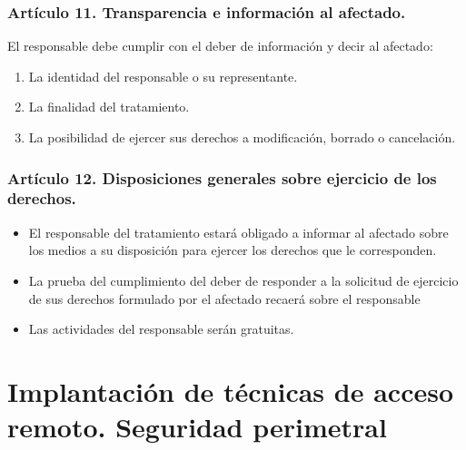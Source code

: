 \documentclass[letterpaper,10pt,spanish]{sphinxmanual}
\begin{document}
\subsection{Artículo 11. Transparencia e información al afectado.}
\label{\detokenize{tema_lopd/tema_lopd:articulo-11-transparencia-e-informacion-al-afectado}}
El responsable debe cumplir con el deber de información y decir al afectado:
\begin{enumerate}
%
\item {} 
La identidad del responsable o su representante.

\item {} 
La finalidad del tratamiento.

\item {} 
La posibilidad de ejercer sus derechos a modificación, borrado o cancelación.

\end{enumerate}


\subsection{Artículo 12. Disposiciones generales sobre ejercicio de los derechos.}
\label{\detokenize{tema_lopd/tema_lopd:articulo-12-disposiciones-generales-sobre-ejercicio-de-los-derechos}}\begin{itemize}
\item {} 
El responsable del tratamiento estará obligado a informar al afectado sobre los medios a su disposición para ejercer los derechos que le corresponden.

\item {} 
La prueba del cumplimiento del deber de responder a la solicitud de ejercicio de sus derechos formulado por el afectado recaerá sobre el responsable

\item {} 
Las actividades del responsable serán gratuitas.

\end{itemize}


\chapter{Implantación de técnicas de acceso remoto. Seguridad perimetral}
\label{\detokenize{tema_acceso_remoto/tema_acceso_remoto:implantacion-de-tecnicas-de-acceso-remoto-seguridad-perimetral}}\label{\detokenize{tema_acceso_remoto/tema_acceso_remoto::doc}}
\end{document}
